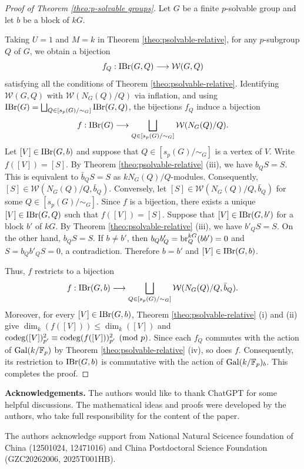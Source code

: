 \documentclass[preprint,12pt,3p]{elsarticle}
\def\IBr{{\rm IBr}}
\def\br{{\rm br}}
\def\Gal{{\rm Gal}}
\def\W{\mathcal{W}}
\def\F{\mathbb{F}}
\begin{document}
\begin{proof}[Proof of Theorem
\ref{theo:p-solvable groups}]
Let $G$ be a finite $p$-solvable
group and let $b$ be a block of
$kG$.

Taking $U=1$ and $M=k$ in
Theorem \ref{theo:psolvable-relative}, for any $p$-subgroup $Q$ of $G$,
we obtain a bijection
\[
f_Q:\IBr(G,Q)
\longrightarrow
\W(G,Q)
\]
satisfying all the conditions of
Theorem \ref{theo:psolvable-relative}.
Identifying $\W(G,Q)$ with
$\W(N_G(Q)/Q)$ via inflation, and using
$\IBr(G)=
\bigsqcup_{Q\in[s_p(G)/\sim_G]}\IBr(G,Q)$,
the bijections $f_Q$ induce a bijection
\[
f:\IBr(G)\longrightarrow
\bigsqcup_{Q\in[s_p(G)/\sim_G]}
\W(N_G(Q)/Q).
\]
Let $[V]\in\IBr(G,b)$ and suppose that
$Q\in[s_p(G)/\sim_G]$ is a vertex of $V$.
Write $f([V])=[S]$.
By Theorem \ref{theo:psolvable-relative} (iii),
we have $b_QS=S$.
This is equivalent to
$\bar b_QS=S$ as $k N_G(Q)/Q$-modules.
Consequently,
$[S]\in\W(N_G(Q)/Q,\bar b_Q)$.
Conversely, let
$[S]\in\W(N_G(Q)/Q,\bar b_Q)$
for some $Q\in[s_p(G)/\sim_G]$.
Since $f$ is a bijection, there exists
a unique $[V]\in\IBr(G,Q)$ such that
$f([V])=[S]$.
Suppose that $[V] \in \IBr(G,b')$ for a block $b'$ of $kG$.
By Theorem \ref{theo:psolvable-relative} (iii),
we have $b'_QS=S$.
On the other hand, $b_QS=S$.
If $b\neq b'$, then $b_Qb'_Q
=\br_Q^{kG}(bb')=0$ and $S=b_Qb'_QS=0$,
a contradiction.
Therefore $b=b'$ and $[V]\in\IBr(G,b)$.

Thus, $f$ restricts to a bijection
\[
f:\IBr(G,b)\longrightarrow
\bigsqcup_{Q\in[s_p(G)/\sim_G]}
\W(N_G(Q)/Q,\bar b_Q).
\]
Moreover, for every $[V]\in\IBr(G,b)$,
Theorem \ref{theo:psolvable-relative} (i) and (ii)  give
$\dim_k(f([V]))\leq\dim_k([V])$ and ${\rm codeg}([V])_{p'}^2 \equiv {\rm codeg}(f([V]))_{p'}^2 \pmod{p}$.
Since each $f_Q$ commutes with the action
of $\Gal(k/\F_p)$ by Theorem \ref{theo:psolvable-relative} (iv), so does $f$.
Consequently, its restriction to $\IBr(G,b)$
is commutative with the action of $\Gal(k/\F_p)_b$.
This completes the proof.
\end{proof}


\bigskip\noindent\textbf{Acknowledgements.} The authors would like to thank ChatGPT for some helpful discussions. The mathematical ideas and proofs were developed by the authors, who take full responsibility for the content of the paper. 

The authors acknowledge support from National Natural Scicence foundation of China (12501024, 12471016) and China Postdoctoral Science Foundation (GZC20262006, 2025T001HB).
\end{document}
